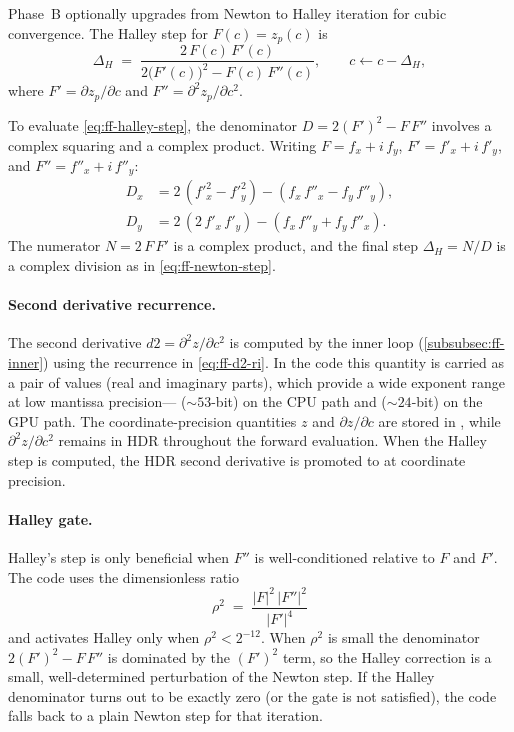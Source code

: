 Phase~B optionally upgrades from Newton to Halley iteration for cubic
convergence.  The Halley step for $F(c) = z_p(c)$ is
\begin{equation}\label{eq:ff-halley-step}
\Delta_H \;=\;
  \frac{2\,F(c)\,F'(c)}
       {2\bigl(F'(c)\bigr)^2 - F(c)\,F''(c)},
\qquad c \leftarrow c - \Delta_H,
\end{equation}
where $F'=\partial z_p/\partial c$ and $F''=\partial^2 z_p/\partial c^2$.

To evaluate \eqref{eq:ff-halley-step}, the denominator $D = 2(F')^2 - F\,F''$ involves a complex squaring and a
complex product.  Writing $F = f_x + i\,f_y$, $F' = f'_x + i\,f'_y$, and
$F'' = f''_x + i\,f''_y$:
\begin{align}
D_x &= 2\,(f'^2_x - f'^2_y) - (f_x\,f''_x - f_y\,f''_y), \\
D_y &= 2\,(2\,f'_x\,f'_y) - (f_x\,f''_y + f_y\,f''_x).
\end{align}
The numerator $N = 2\,F\,F'$ is a complex product, and the final step
$\Delta_H = N / D$ is a complex division as in \cref{eq:ff-newton-step}.

\paragraph{Second derivative recurrence.}
The second derivative $d2 = \partial^2 z/\partial c^2$ is computed by the
inner loop (\cref{subsubsec:ff-inner}) using the recurrence in
\cref{eq:ff-d2-ri}.  In the code this quantity is carried as a pair of
 values (real and imaginary parts), which provide a
wide exponent range at low mantissa precision---
(${\sim}53$-bit) on the CPU path and 
(${\sim}24$-bit) on the GPU path.  The coordinate-precision
quantities $z$ and $\partial z/\partial c$ are stored in ,
while $\partial^2 z/\partial c^2$ remains in HDR throughout the forward
evaluation.  When the Halley step is computed, the HDR second
derivative is promoted to  at coordinate precision.

\paragraph{Halley gate.}
Halley's step is only beneficial when $F''$ is well-conditioned relative to
$F$ and $F'$.  The code uses the dimensionless ratio
\begin{equation}\label{eq:ff-halley-gate}
\rho^2 \;=\;
  \frac{|F|^2\,|F''|^2}{|F'|^4}
\end{equation}
and activates Halley only when $\rho^2 < 2^{-12}$.  When $\rho^2$ is
small the denominator $2(F')^2 - F\,F''$ is dominated by the $(F')^2$ term,
so the Halley correction is a small, well-determined perturbation of the
Newton step.  If the Halley denominator turns out to be exactly zero (or the
gate is not satisfied), the code falls back to a plain Newton step for that
iteration.

